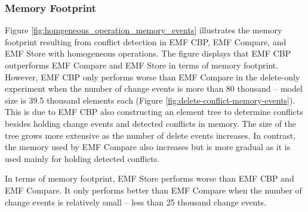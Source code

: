 \subsubsection{Memory Footprint}
\label{sec:memory_footprint}
Figure \ref{fig:homgeneous_operation_memory_events} illustrates the memory footprint resulting from conflict detection in EMF CBP, EMF Compare, and EMF Store with homogeneous operations. The figure displays that EMF CBP outperforms EMF Compare and EMF Store in terms of memory footprint. However, EMF CBP only performs worse than EMF Compare in the delete-only experiment when the number of change events is more than 80 thousand -- model size is 39.5 thousand elements each (Figure \ref{fig:delete-conflict-memory-events}). This is due to EMF CBP also constructing an element tree to determine conflicts besides holding change events and detected conflicts in memory. The size of the tree grows more extensive as the number of delete events increases. In contrast, the memory used by EMF Compare also increases but is more gradual as it is used mainly for holding detected conflicts. 

In terms of memory footprint, EMF Store performs worse than EMF CBP and EMF Compare. It only performs better than EMF Compare when the number of change events is relatively small -- less than 25 thousand change events. 

